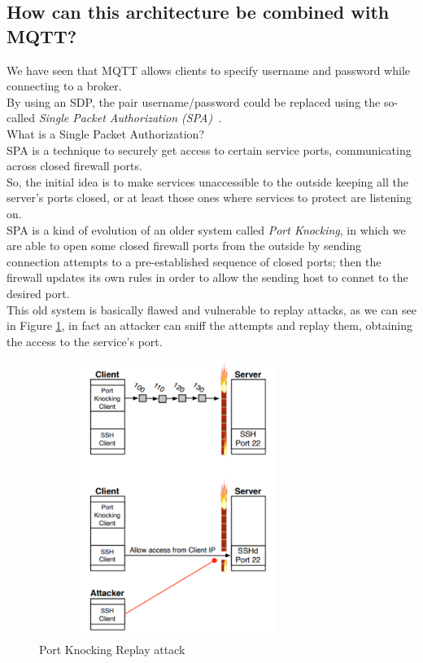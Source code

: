 \documentclass[12pt]{report}
\begin{document}
{\subsection{How can this architecture be combined with MQTT?}
\bigskip

We have seen that MQTT allows clients to specify username and password while connecting to a broker.\\By using an SDP, the pair username/password could be replaced using the so-called \emph{Single Packet Authorization (SPA)}~\cite{mqttonlywithsdp}.\\

What is a Single Packet Authorization?~\cite{portknockandspaanalysis}\\

SPA is a technique to securely get access to certain service ports, communicating across closed firewall ports.\\
So, the initial idea is to make services unaccessible to the outside keeping all the server's ports closed, or at least those ones where services to protect are listening on.\\

SPA is a kind of evolution of an older system called \emph{Port Knocking}, in which we are able to  open some closed firewall ports from the outside by sending connection attempts to a pre-established sequence of closed ports; then the firewall updates its own rules in order to allow the sending host to connet to the desired port.\\
This old system is basically flawed and vulnerable to replay attacks, as we can see in Figure \ref{fig:portknocking}, in fact an attacker can sniff the attempts and replay them, obtaining the access to the service's port.\\

\begin{figure}[H]
\includegraphics[width=9cm,height=9cm,keepaspectratio]{port_knocking}
\centering
\caption{Port Knocking Replay attack}
\label{fig:portknocking}
\end{figure}

}
\end{document}
